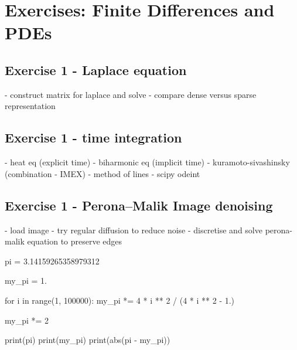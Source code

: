 \documentclass[a4paper]{article}
\begin{document}
\section*{Exercises: Finite Differences and PDEs}

\vspace{0,75cm}


\subsection*{Exercise 1 - Laplace equation}

- construct matrix for laplace and solve
- compare dense versus sparse representation

\subsection*{Exercise 1 - time integration}

- heat eq (explicit time)
- biharmonic eq (implicit time)
- kuramoto-sivashinsky (combination - IMEX)
- method of lines - scipy odeint

\subsection*{Exercise 1 - Perona–Malik Image denoising}

- load image
- try regular diffusion to reduce noise
- discretise and solve perona-malik equation to preserve edges

 
\begin{solution}
\begin{python}
pi = 3.14159265358979312

my_pi = 1.

for i in range(1, 100000):
    my_pi *= 4 * i ** 2 / (4 * i ** 2 - 1.)

my_pi *= 2

print(pi)
print(my_pi)
print(abs(pi - my_pi))
\end{python}
\end{solution}
\end{document}
